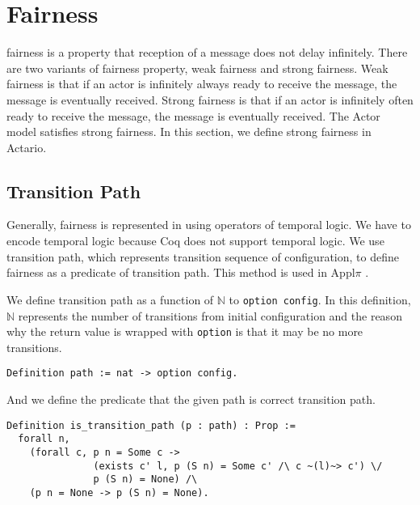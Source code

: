 \section{Fairness}

\textsf{fairness} is a property that reception of a message does not delay infinitely.
There are two variants of fairness property, weak fairness and strong fairness.
Weak fairness is that if an actor is infinitely always ready to receive the message, the message is eventually received.
Strong fairness is that if an actor is infinitely often ready to receive the message, the message is eventually received.
The Actor model satisfies strong fairness.
In this section, we define strong fairness in Actario.

\subsection{Transition Path}
Generally, fairness is represented in using operators of temporal logic.
We have to encode temporal logic because Coq does not support temporal logic.
We use transition path, which represents transition sequence of configuration, to define fairness as a predicate of transition path.
This method is used in Appl$\pi$ \cite{Affeldt200817}.

We define transition path as a function of $\mathbb{N}$ to \texttt{option config}.
In this definition, $\mathbb{N}$ represents the number of transitions from initial configuration and the reason why the return value is wrapped with \texttt{option} is that it may be no more transitions.

\begin{lstlisting}
Definition path := nat -> option config.
\end{lstlisting}

And we define the predicate that the given path is correct transition path.

\begin{lstlisting}
Definition is_transition_path (p : path) : Prop :=
  forall n,
    (forall c, p n = Some c ->
               (exists c' l, p (S n) = Some c' /\ c ~(l)~> c') \/
               p (S n) = None) /\
    (p n = None -> p (S n) = None).
\end{lstlisting}

